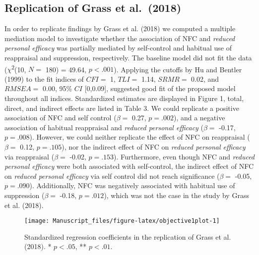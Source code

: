 \documentclass[
  english,
  man,floatsintext]{apa6}
\begin{document}
\hypertarget{replication-of-grass-et-al.-2018-1}{%
\subsection{Replication of Grass et al.~(2018)}\label{replication-of-grass-et-al.-2018-1}}

In order to replicate findings by Grass et al. (2018) we computed a multiple mediation model to investigate whether the association of NFC and \emph{reduced personal efficacy} was partially mediated by self-control and habitual use of reappraisal and suppression, respectively.
The baseline model did not fit the data (\(\chi\)\textsuperscript{2}(10, \(N=\) 180) = 49.64, \(p < .001\)).
Applying the cutoffs by Hu and Bentler (1999) to the fit indices of \(CFI=\) 1, \(TLI=\) 1.14, \(SRMR=\) 0.02, and \(RMSEA=\) 0.00, 95\% \(CI\) {[}0,0.09{]}, suggested good fit of the proposed model throughout all indices.
Standardized estimates are displayed in Figure 1, total, direct, and indirect effects are listed in Table 3.
We could replicate a positive association of NFC and self control (\(\beta=\) 0.27, \(p=.002\)), and a negative association of habitual reappraisal and \emph{reduced personal efficacy} (\(\beta=\) -0.17, \(p=.008\)).
However, we could neither replicate the effect of NFC on reappraisal (\(\beta=\) 0.12, \(p=.105\)), nor the indirect effect of NFC on \emph{reduced personal efficacy} via reappraisal (\(\beta=\) -0.02, \(p=.153\)).
Furthermore, even though NFC and \emph{reduced personal efficacy} were both associated with self-control, the indirect effect of NFC on \emph{reduced personal efficacy} via self control did not reach significance (\(\beta=\) -0.05, \(p=.090\)).
Additionally, NFC was negatively associated with habitual use of suppression (\(\beta=\) -0.18, \(p=.012\)), which was not the case in the study by Grass et al. (2018).

\begin{figure}[H]
\texttt{[image: Manuscript\_files/figure-latex/objective1plot-1]} \caption{Standardized regression coefficients in the replication of Grass et al. (2018). * $p<.05$, ** $p<.01$.}\label{fig:objective1plot}
\end{figure}
\end{document}
